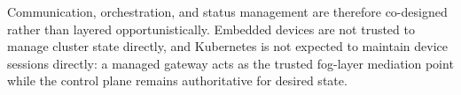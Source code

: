 Communication, orchestration, and status management are therefore co-designed rather than layered opportunistically. Embedded devices are not trusted to manage cluster state directly, and Kubernetes is not expected to maintain device sessions directly: a managed gateway acts as the trusted fog-layer mediation point while the control plane remains authoritative for desired state.
